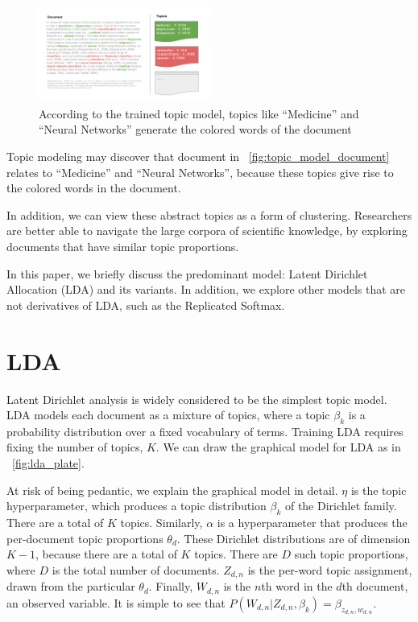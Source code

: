 \documentclass[letterpaper]{article}
\begin{document}
\begin{figure}[ht]
  \centering
  \includegraphics[width=0.5\textwidth]{topic_models.png}
  \caption{\label{fig:topic_model_document} According to the trained
    topic model, topics like ``Medicine'' and ``Neural Networks''
    generate the colored words of the document}
\end{figure}

Topic modeling may discover that document in
~\autoref{fig:topic_model_document} relates to ``Medicine'' and
``Neural Networks'', because these topics give rise to the colored
words in the document.

In addition, we can view these abstract topics as a form of clustering.
Researchers are better able to navigate the large corpora of
scientific knowledge, by exploring documents that have similar topic
proportions.

In this paper, we briefly discuss the predominant model: Latent
Dirichlet Allocation (LDA) and its variants. In addition, we explore
other models that are not derivatives of LDA, such as the Replicated
Softmax.

\section{LDA}
Latent Dirichlet analysis is widely considered to be the simplest
topic model. LDA models each document as a mixture of topics, where a
topic $\beta_k$ is a probability distribution over a fixed vocabulary
of terms. Training LDA requires fixing the number of topics, $K$.
We can draw the graphical model for LDA as in
~\autoref{fig:lda_plate}.

At risk of being pedantic, we explain the graphical model in detail.
$\eta$ is the topic hyperparameter, which produces a topic
distribution $\beta_k$ of the Dirichlet family. There are a total of
$K$ topics. Similarly, $\alpha$ is a hyperparameter that produces the
per-document topic proportions $\theta_d$. These Dirichlet
distributions are of dimension $K-1$, because there are a total of $K$
topics. There are $D$ such topic proportions, where $D$ is the total
number of documents. $Z_{d,n}$ is the per-word topic assignment, drawn
from the particular $\theta_d$. Finally, $W_{d,n}$ is the $n$th word
in the $d$th document, an observed variable. It is simple to see that
$P(W_{d,n} | Z_{d,n}, \beta_{k}) = \beta_{z_{d,n}, w_{d,n}}$.
\end{document}
